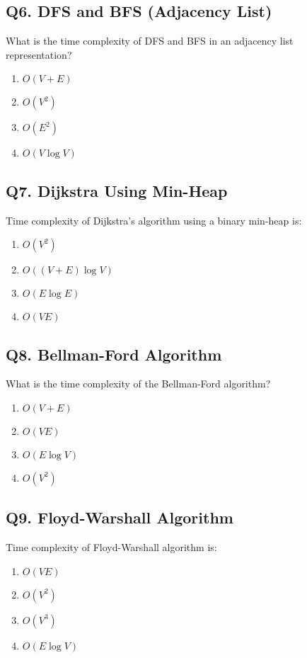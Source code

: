 \subsection*{Q6. DFS and BFS (Adjacency List)}
What is the time complexity of DFS and BFS in an adjacency list representation?

\begin{enumerate}[label=(\alph*)]
    \item \(O(V+E)\) \quad
    \item \(O(V^2)\) \quad
    \item \(O(E^2)\) \quad
    \item \(O(V \log V)\)
\end{enumerate}


\subsection*{Q7. Dijkstra Using Min-Heap}
Time complexity of Dijkstra’s algorithm using a binary min-heap is:

\begin{enumerate}[label=(\alph*)]
    \item \(O(V^2)\) \quad
    \item \(O((V + E)\log V)\) \quad
    \item \(O(E \log E)\) \quad
    \item \(O(VE)\)
\end{enumerate}


\subsection*{Q8. Bellman-Ford Algorithm}
What is the time complexity of the Bellman-Ford algorithm?

\begin{enumerate}[label=(\alph*)]
    \item \(O(V + E)\) \quad
    \item \(O(VE)\) \quad
    \item \(O(E \log V)\) \quad
    \item \(O(V^2)\)
\end{enumerate}


\subsection*{Q9. Floyd-Warshall Algorithm}
Time complexity of Floyd-Warshall algorithm is:

\begin{enumerate}[label=(\alph*)]
    \item \(O(VE)\) \quad
    \item \(O(V^2)\) \quad
    \item \(O(V^3)\) \quad
    \item \(O(E \log V)\)
\end{enumerate}


